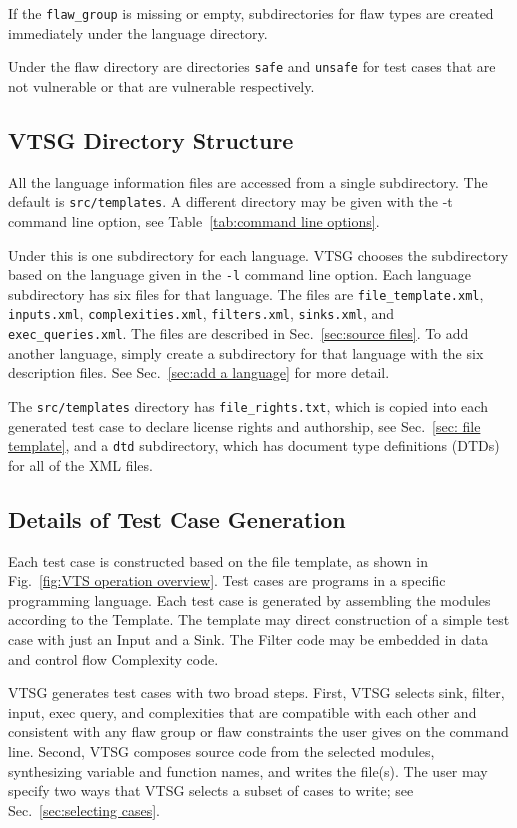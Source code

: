 \documentclass[12pt]{article}
\begin{document}
If the \verb|flaw_group| is missing or empty, subdirectories for flaw types are
created immediately under the language directory.

Under the flaw directory are directories \verb|safe| and \verb|unsafe| for test
cases that are not vulnerable or that are vulnerable respectively.

\subsection{VTSG Directory Structure}
\label{sec: directory structure}

All the language information files are accessed from a single subdirectory.
The default is \verb|src/templates|.  A different directory may be
given with the -t command
line option, see Table~\ref{tab:command line options}.

Under this is one subdirectory for each language.  VTSG chooses the
subdirectory based on the language given in the \verb|-l| command line
option.  Each language subdirectory has six files for that language.
The files are \verb|file_template.xml|, \verb|inputs.xml|,
\verb|complexities.xml|, \verb|filters.xml|, \verb|sinks.xml|,
and \verb|exec_queries.xml|.
The files are described in Sec.~\ref{sec:source files}.
To add another language,
simply create a subdirectory for that language with the six description
files.  See Sec.~\ref{sec:add a language} for more detail.

The \verb|src/templates| directory has \verb|file_rights.txt|, which is
copied into each generated test case to declare license rights and
authorship, see Sec.~\ref{sec: file template}, and a 
\verb|dtd| subdirectory, which has document type definitions (DTDs)
for all of the XML files.


\subsection{Details of Test Case Generation}
\label{sec: generation detail}

Each test case is constructed based on the file template, as shown
in Fig.~\ref{fig:VTS operation overview}. Test cases are 
programs in a specific programming language.
Each test case is generated by
assembling the modules according to the Template.  The
template may direct construction of a simple test case with just
an Input and a Sink.
The Filter code may be embedded in data and control flow
Complexity code.

VTSG generates test cases with two broad steps.  First, VTSG selects
sink, filter, input, exec query, and complexities that are
compatible with each other and consistent with any flaw group or
flaw constraints the user gives on the command line.  Second, VTSG
composes source code from the selected modules, 
synthesizing variable and function names, and writes the file(s).
The user may specify two ways that VTSG selects a subset of cases to write; see
Sec.~\ref{sec:selecting cases}.
\end{document}
